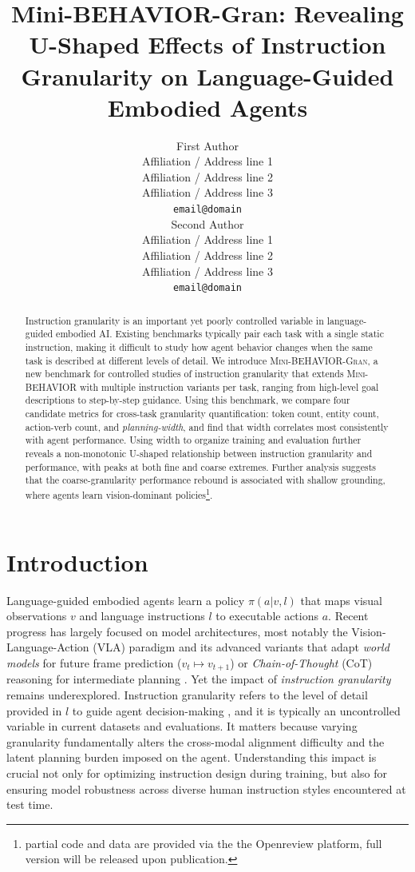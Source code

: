 \documentclass[11pt]{article}
\title{Mini-BEHAVIOR-Gran: Revealing U-Shaped Effects of Instruction Granularity on Language-Guided Embodied Agents}
\author{First Author \\
  Affiliation / Address line 1 \\
  Affiliation / Address line 2 \\
  Affiliation / Address line 3 \\
  \texttt{email@domain} \\\And
  Second Author \\
  Affiliation / Address line 1 \\
  Affiliation / Address line 2 \\
  Affiliation / Address line 3 \\
  \texttt{email@domain} \\}
\begin{document}
\maketitle
\begin{abstract}
Instruction granularity is an important yet poorly controlled variable in language-guided embodied AI. Existing benchmarks typically pair each task with a single static instruction, making it difficult to study how agent behavior changes when the same task is described at different levels of detail. We introduce \textsc{Mini-BEHAVIOR-Gran}, a new benchmark for controlled studies of instruction granularity that extends \textsc{Mini-BEHAVIOR} with multiple instruction variants per task, ranging from high-level goal descriptions to step-by-step guidance. Using this benchmark, we compare four candidate metrics for cross-task granularity quantification: token count, entity count, action-verb count, and \emph{planning-width}, and find that width correlates most consistently with agent performance. Using width to organize training and evaluation further reveals a non-monotonic U-shaped relationship between instruction granularity and performance, with peaks at both fine and coarse extremes. Further analysis suggests that the coarse-granularity performance rebound is associated with shallow grounding, where agents learn vision-dominant policies\footnote{partial code and data are provided via the the Openreview platform, full version will be released upon publication.}.
\end{abstract}

\section{Introduction}
\label{sec:introduction}


Language-guided embodied agents learn a policy $\pi(a|v,l)$ that maps visual observations $v$ and language instructions $l$ to executable actions $a$. Recent progress has largely focused on model architectures, most notably the Vision-Language-Action (VLA) paradigm \citep{DBLP:conf/corl/KimPKXB0RFSVKBT24,pmlr-v305-black25a,shukor2025smolvla} and its advanced variants that adapt \emph{world models} for future frame prediction ($v_t \mapsto v_{t+1}$) \citep{wu2026pragmaticvlafoundationmodel,DBLP:conf/cvpr/ZhaoLKFZWLMHFHL25,bi2025motusunifiedlatentaction} or \emph{Chain-of-Thought} (CoT) reasoning for intermediate planning \citep{ye2025vlar1enhancingreasoningvisionlanguageaction,lu2025thinkbot,yin2025deepthinkvla}. Yet the impact of \emph{instruction granularity} remains underexplored. Instruction granularity refers to the level of detail provided in $l$ to guide agent decision-making \citep{arumugam2017accurately}, and it is typically an uncontrolled variable in current datasets and evaluations. It matters because varying granularity fundamentally alters the cross-modal alignment difficulty and the latent planning burden imposed on the agent. Understanding this impact is crucial not only for optimizing instruction design during training, but also for ensuring model robustness across diverse human instruction styles encountered at test time.
\end{document}

